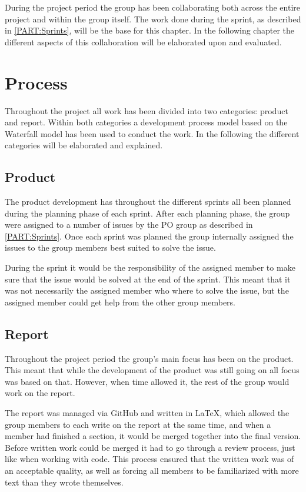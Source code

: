 During the project period the group has been collaborating both across the entire project and within the group itself. 
The work done during the sprint, as described in \autoref{PART:Sprints}, will be the base for this chapter.
In the following chapter the different aspects of this collaboration will be elaborated upon and evaluated. 

\section{Process}
Throughout the project all work has been divided into two categories: product and report. 
Within both categories a development process model based on the Waterfall model has been used to conduct the work. 
In the following the different categories will be elaborated and explained.

\subsection{Product}
The product development has throughout the different sprints all been planned during the planning phase of each sprint. 
After each planning phase, the group were assigned to a number of issues by the PO group as described in \autoref{PART:Sprints}.
Once each sprint was planned the group internally assigned the issues to the group members best suited to solve the issue.

During the sprint it would be the responsibility of the assigned member to make sure that the issue would be solved at the end of the sprint. 
This meant that it was not necessarily the assigned member who where to solve the issue, but the assigned member could get help from the other group members.

\subsection{Report}
Throughout the project period the group's main focus has been on the product. 
This meant that while the development of the product was still going on all focus was based on that.
However, when time allowed it, the rest of the group would work on the report. 

The report was managed via GitHub and written in \LaTeX, which allowed the group members to each write on the report at the same time, and when a member had finished a section, it would be merged together into the final version. 
Before written work could be merged it had to go through a review process, just like when working with code. 
This process ensured that the written work was of an acceptable quality, as well as forcing all members to be familiarized with more text than they wrote themselves. 

